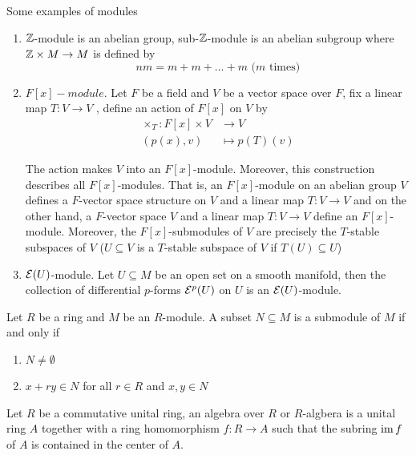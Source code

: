 \begin{remark}
	Some examples of modules
	
	\begin{enumerate}
		\item $\mathbb{Z}$-module is an abelian group, sub-$\mathbb{Z}$-module is an abelian subgroup where $\mathbb{Z} \times M \to M$ is defined by
		$$
		n m = m + m + ... + m \text{ ($m$ times)}
		$$
		
		\item $F[x]-module$. Let $F$ be a field and $V$ be a vector space over $F$, fix a linear map $T: V \to V$ , define an action of $F[x]$ on $V$ by
		\begin{align*}
			\times_T :F[x] \times V &\to V \\
			(p(x), v) &\mapsto p(T)(v)
		\end{align*}
		
		The action makes $V$ into an $F[x]$-module. Moreover, this construction describes all $F[x]$-modules. That is, an $F[x]$-module on an abelian group $V$ defines a $F$-vector space structure on $V$ and a linear map $T: V \to V$ and on the other hand, a $F$-vector space $V$ and a linear map $T: V \to V$ define an $F[x]$-module. Moreover, the $F[x]$-submodules of $V$ are precisely the $T$-stable subspaces of $V$ ($U \subseteq V$ is a $T$-stable subspace of $V$ if $T(U) \subseteq U$)
		
		\item $\mathcal{E}(U)$-module. Let $U \subseteq M$ be an open set on a smooth manifold, then the collection of differential $p$-forms $\mathcal{E}^p(U)$ on $U$ is an $\mathcal{E}(U)$-module.
	\end{enumerate}
\end{remark}

\begin{proposition}
	Let $R$ be a ring and $M$ be an $R$-module. A subset $N \subseteq M$ is a submodule of $M$ if and only if
	\begin{enumerate}
		\item $N \neq \emptyset$
		\item $x  + ry \in N$  for all $r \in R$ and $x, y \in N$
	\end{enumerate}
\end{proposition}

\begin{definition}
	Let $R$ be a commutative unital ring, an algebra over $R$ or $R$-algbera is a unital ring $A$ together with a ring homomorphism $f: R \to A$ such that the subring $\operatorname{im} f$ of $A$ is contained in the center of $A$. 
\end{definition}

